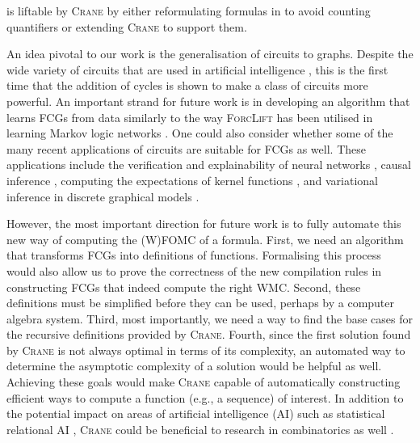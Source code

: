 \begin{conjecture}
  \Ctwo{} is liftable by \textsc{Crane} by either reformulating formulas in
  \Ctwo{} to avoid counting quantifiers or extending \textsc{Crane} to support
  them.
\end{conjecture}

An idea pivotal to our work is the generalisation of circuits to graphs. Despite
the wide variety of circuits that are used in artificial intelligence
\citep{DBLP:series/faia/Darwiche21}, this is the first time that the addition of
cycles is shown to make a class of circuits more powerful. An important strand
for future work is in developing an algorithm that learns FCGs from data
similarly to the way \textsc{ForcLift} has been utilised in learning Markov
logic networks \citep{DBLP:conf/aaai/BroeckMD13,DBLP:journals/ml/HaarenBMD16}.
One could also consider whether some of the many recent applications of circuits
are suitable for FCGs as well. These applications include the verification and
explainability of neural networks \citep{DBLP:conf/pods/Darwiche20}, causal
inference \citep{DBLP:journals/corr/abs-2202-02891}, computing the expectations
of kernel functions \citep{DBLP:conf/uai/LiZVB21}, and variational inference in
discrete graphical models \citep{DBLP:conf/nips/ShihE20}.

However, the most important direction for future work is to fully automate this
new way of computing the (W)FOMC of a formula. First, we need an algorithm that
transforms FCGs into definitions of functions. Formalising this process would
also allow us to prove the correctness of the new compilation rules in
constructing FCGs that indeed compute the right WMC\@. Second, these definitions
must be simplified before they can be used, perhaps by a computer algebra
system. Third, most importantly, we need a way to find the base cases for the
recursive definitions provided by \textsc{Crane}. Fourth, since the first
solution found by \textsc{Crane} is not always optimal in terms of its
complexity, an automated way to determine the asymptotic complexity of a
solution would be helpful as well. Achieving these goals would make
\textsc{Crane} capable of automatically constructing efficient ways to compute a
function (e.g., a sequence) of interest. In addition to the potential impact on
areas of artificial intelligence (AI) such as statistical relational AI
\citep{DBLP:series/synthesis/2016Raedt}, \textsc{Crane} could be beneficial to
research in combinatorics as well \citep{DBLP:conf/ilp/BarvinekB0ZK21}.

